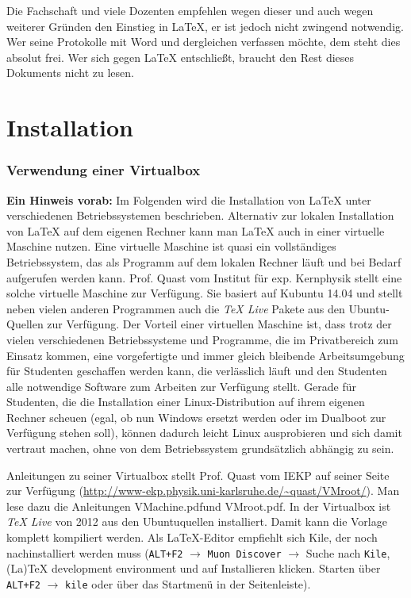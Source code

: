 Die Fachschaft und viele Dozenten empfehlen wegen dieser und auch wegen weiterer Gründen den Einstieg in LaTeX, er ist jedoch nicht zwingend notwendig. Wer seine Protokolle mit Word und dergleichen verfassen möchte, dem steht dies absolut frei. Wer sich gegen LaTeX entschließt, braucht den Rest dieses Dokuments nicht zu lesen.

\section{Installation}
\subsubsection{Verwendung einer Virtualbox}
\textbf{Ein Hinweis vorab:} Im Folgenden wird die Installation von LaTeX unter verschiedenen Betriebssystemen beschrieben. Alternativ zur lokalen Installation von LaTeX auf dem eigenen Rechner kann man LaTeX auch in einer virtuelle Maschine nutzen. Eine virtuelle Maschine ist quasi ein vollständiges Betriebssystem, das als Programm auf dem lokalen Rechner läuft und bei Bedarf aufgerufen werden kann. Prof. Quast vom Institut für exp. Kernphysik stellt eine solche virtuelle Maschine zur Verfügung. Sie basiert auf Kubuntu 14.04 und stellt neben vielen anderen Programmen auch die \textit{TeX Live} Pakete aus den Ubuntu-Quellen zur Verfügung. Der Vorteil einer virtuellen Maschine ist, dass trotz der vielen verschiedenen Betriebssysteme und Programme, die im Privatbereich zum Einsatz kommen, eine vorgefertigte und immer gleich bleibende Arbeitsumgebung für Studenten geschaffen werden kann, die verlässlich läuft und den Studenten alle notwendige Software zum Arbeiten zur Verfügung stellt. Gerade für Studenten, die die Installation einer Linux-Distribution auf ihrem eigenen Rechner scheuen (egal, ob nun Windows ersetzt werden oder im Dualboot zur Verfügung stehen soll), können dadurch leicht Linux ausprobieren und sich damit vertraut machen, ohne von dem Betriebssystem grundsätzlich abhängig zu sein.

Anleitungen zu seiner Virtualbox stellt Prof. Quast vom IEKP auf seiner Seite zur Verfügung (\url{http://www-ekp.physik.uni-karlsruhe.de/~quast/VMroot/}). Man lese dazu die Anleitungen \glqq VMachine.pdf\grqq und \glqq VMroot.pdf\grqq. In der Virtualbox ist \textit{TeX Live} von 2012 aus den Ubuntuquellen installiert. Damit kann die Vorlage komplett kompiliert werden. Als LaTeX-Editor empfiehlt sich Kile, der noch nachinstalliert werden muss (\verb|ALT+F2| $\rightarrow$ \verb|Muon Discover| $\rightarrow$ Suche nach \verb|Kile|, (La)TeX development environment und auf Installieren klicken. Starten über \verb|ALT+F2| $\rightarrow$ \verb|kile| oder über das Startmenü in der Seitenleiste).

